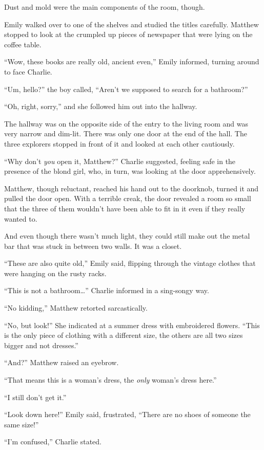 Dust and mold were the main components of the room, though.

Emily walked over to one of the shelves and studied the titles carefully. Matthew stopped to look at the crumpled up pieces of newspaper that were lying on the coffee table.

“Wow, these books are really old, ancient even,” Emily informed, turning around to face Charlie.

“Um, hello?” the boy called, “Aren't we supposed to search for a bathroom?”

“Oh, right, sorry,” and she followed him out into the hallway.

The hallway was on the opposite side of the entry to the living room and was very narrow and dim-lit. There was only one door at the end of the hall. The three explorers stopped in front of it and looked at each other cautiously.

“Why don't \textit{you} open it, Matthew?” Charlie suggested, feeling safe in the presence of the blond girl, who, in turn, was looking at the door apprehensively.

Matthew, though reluctant, reached his hand out to the doorknob, turned it and pulled the door open. With a terrible creak, the door revealed a room so small that the three of them wouldn't have been able to fit in it even if they really wanted to.

And even though there wasn't much light, they could still make out the metal bar that was stuck in between two walls. It was a closet.

“These are also quite old,” Emily said, flipping through the vintage clothes that were hanging on the rusty racks.

“This is not a bathroom…” Charlie informed in a sing-songy way.

“No kidding,” Matthew retorted sarcastically.

“No, but look!” She indicated at a summer dress with embroidered flowers. “This is the only piece of clothing with a different size, the others are all two sizes bigger and not dresses.”

“And?” Matthew raised an eyebrow.

“That means this is a woman's dress, the \textit{only} woman's dress here.”

“I still don't get it.”

“Look down here!” Emily said, frustrated, “There are no shoes of someone the same size!”

“I'm confused,” Charlie stated.

